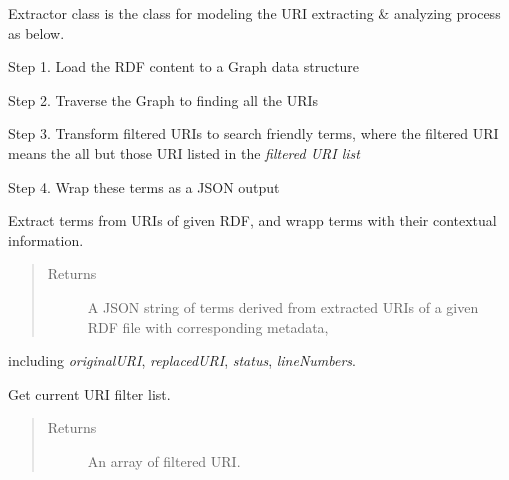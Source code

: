 \documentclass[letterpaper,10pt,english]{sphinxmanual}
\begin{document}
\begin{fulllineitems}
\label{docs/api:Extractor}
Extractor class is the class for modeling the
URI extracting \& analyzing process as below.

Step 1. Load the RDF content to a Graph data structure

Step 2. Traverse the Graph to finding all the URIs

Step 3. Transform filtered URIs to search friendly terms, where the filtered URI means the all but those URI listed in the \emph{filtered URI list}

Step 4. Wrap these terms as a JSON output

\begin{fulllineitems}
\label{docs/api:Extractor::getQueryTerms}
Extract terms from URIs of given RDF, and wrapp terms
with their contextual information.
\begin{quote}\begin{description}
\item[{Returns}] \leavevmode
A JSON string of terms derived from extracted URIs of a given RDF file with corresponding metadata,

\end{description}\end{quote}

including \emph{originalURI}, \emph{replacedURI}, \emph{status}, \emph{lineNumbers}.

\end{fulllineitems}


\begin{fulllineitems}
\label{docs/api:Extractor::getFiltedUris}
Get current URI filter list.
\begin{quote}\begin{description}
\item[{Returns}] \leavevmode
An array of filtered URI.

\end{description}\end{quote}

\end{fulllineitems}



\end{fulllineitems}
\end{document}
